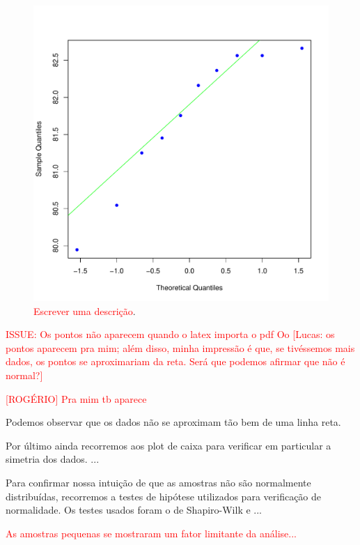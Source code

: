 \documentclass[conference]{IEEEtran}
\begin{document}
\begin{figure}[h]
	\centering
	\includegraphics[width=\linewidth]{img/bluenorm_afsa_mfd.pdf}
	\caption{\textcolor{red}{Escrever uma descrição}.}
	\label{fig:hist_afas_mfd}
\end{figure}


\textcolor{red}{ISSUE: Os pontos não aparecem quando o latex importa o pdf Oo [Lucas: os pontos aparecem pra mim; além disso, minha impressão é que, se tivéssemos mais dados, os pontos se aproximariam da reta. Será que podemos afirmar que não é normal?]}

\textcolor{red}{[ROGÉRIO] Pra mim tb aparece}

Podemos observar que os dados não se aproximam tão bem de uma linha reta.

Por último ainda recorremos aos plot de caixa para verificar em particular a simetria dos dados. ...

Para confirmar nossa intuição de que as amostras não são normalmente distribuídas, recorremos a testes de hipótese utilizados para verificação de normalidade.
Os testes usados foram o de Shapiro-Wilk \cite{shapiro1965analysis} e ...	

\textcolor{red}{As amostras pequenas se mostraram um fator limitante da análise...}
\end{document}
